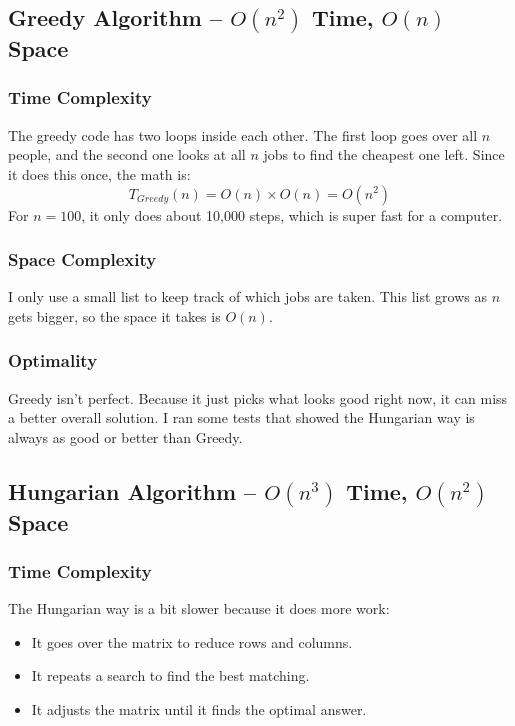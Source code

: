 \documentclass[12pt,a4paper]{article}
\begin{document}
\subsection{Greedy Algorithm -- $O(n^2)$ Time, $O(n)$ Space}

\subsubsection{Time Complexity}

The greedy code has two loops inside each other. The first loop goes over all $n$ 
people, and the second one looks at all $n$ jobs to find the cheapest one left. 
Since it does this once, the math is:
\[
    T_{Greedy}(n) = O(n) \times O(n) = O(n^2)
\]
For $n = 100$, it only does about 10,000 steps, which is super fast for a computer.

\subsubsection{Space Complexity}

I only use a small list to keep track of which jobs are taken. This list grows 
as $n$ gets bigger, so the space it takes is $O(n)$.

\subsubsection{Optimality}

Greedy isn't perfect. Because it just picks what looks good right now, it can 
miss a better overall solution. I ran some tests that showed the Hungarian 
way is always as good or better than Greedy.

\subsection{Hungarian Algorithm -- $O(n^3)$ Time, $O(n^2)$ Space}

\subsubsection{Time Complexity}

The Hungarian way is a bit slower because it does more work:
\begin{itemize}
    \item It goes over the matrix to reduce rows and columns.
    \item It repeats a search to find the best matching.
    \item It adjusts the matrix until it finds the optimal answer.
\end{itemize}
\end{document}
